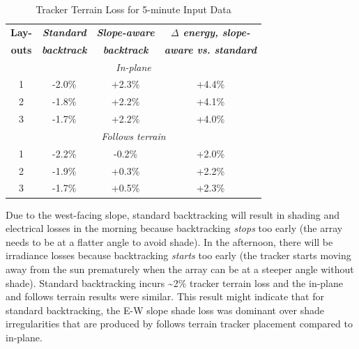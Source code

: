 \documentclass[conference]{IEEEtran}
\begin{document}
\begin{table}[htbp]
\caption{Tracker Terrain Loss for 5-minute Input Data}
\begin{center}
\begin{tabular}{|c|c|c|c|}
\hline
\textbf{Lay-}& \textbf{\textit{Standard}}& \textbf{\textit{Slope-aware}}& \textbf{\textit{$\Delta$ energy, slope-}} \\
\textbf{outs}& \textbf{\textit{backtrack}}&    \textbf{\textit{backtrack}}& \textbf{\textit{aware vs. standard}} \\
\hline
\multicolumn{4}{|c|}{\textit{In-plane}} \\
\hline
1& -2.0\% & +2.3\% &  +4.4\% \\
\hline
2& -1.8\% & +2.2\% &  +4.1\% \\
\hline
3& -1.7\% & +2.2\% &  +4.0\% \\
\hline
\multicolumn{4}{|c|}{\textit{Follows terrain}} \\
\hline
1& -2.2\% & -0.2\% &  +2.0\% \\
\hline
2& -1.9\% & +0.3\% &  +2.2\% \\
\hline
3& -1.7\% & +0.5\% &  +2.3\% \\
\hline
\end{tabular}
\label{table:terrain-loss-5min}
\end{center}
\end{table}

Due to the west-facing slope, standard backtracking will result in shading and electrical losses in the morning because backtracking \textit{stops} too early (the array needs to be at a flatter angle to avoid shade). In the afternoon, there will be irradiance losses because backtracking \textit{starts} too early (the tracker starts moving away from the sun prematurely when the array can be at a steeper angle without shade). Standard backtracking incurs \textasciitilde 2\% tracker terrain loss and the in-plane and follows terrain results were similar. This result might indicate that for standard backtracking, the E-W slope shade loss was dominant over shade irregularities that are produced by follows terrain tracker placement compared to in-plane.
\end{document}
